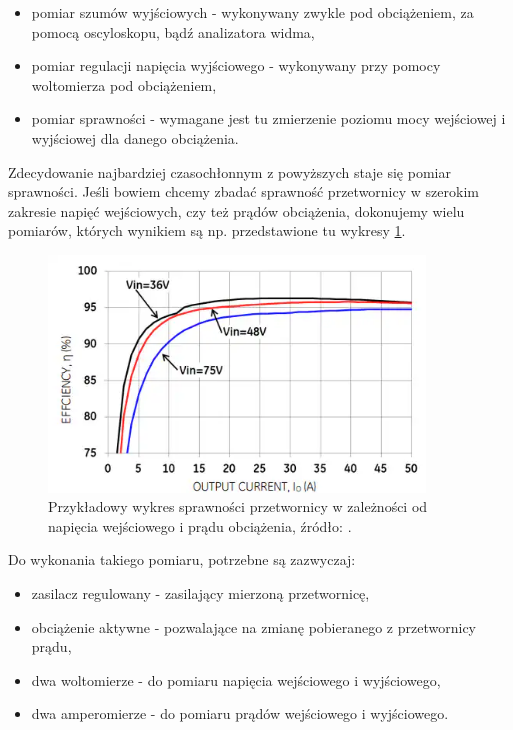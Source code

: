 \begin{itemize}
    \item pomiar szumów wyjściowych - wykonywany zwykle pod obciążeniem, za pomocą oscyloskopu, bądź analizatora widma,
    \item pomiar regulacji napięcia wyjściowego - wykonywany przy pomocy woltomierza pod obciążeniem,
    \item pomiar sprawności - wymagane jest tu zmierzenie poziomu mocy wejściowej i wyjściowej dla danego obciążenia. 
\end{itemize}

Zdecydowanie najbardziej czasochłonnym z powyższych staje się pomiar sprawności. Jeśli bowiem chcemy zbadać sprawność przetwornicy w szerokim zakresie napięć wejściowych, czy też prądów obciążenia, 
dokonujemy wielu pomiarów, których wynikiem są np. przedstawione tu wykresy \ref{fig:przykladowaSprawnosc}.

\begin{figure}[h!]
    \begin{center}
        \includegraphics[width = 10cm]{images/przykladowaSprawnosc.png}
        \caption{Przykładowy wykres sprawności przetwornicy w zależności od napięcia wejściowego i prądu obciążenia, źródło: \cite{przetwornicaOmniON}.}
        \label{fig:przykladowaSprawnosc}
    \end{center}
\end{figure}

Do wykonania takiego pomiaru, potrzebne są zazwyczaj:

\begin{itemize}
    \item zasilacz regulowany - zasilający mierzoną przetwornicę,
    \item obciążenie aktywne - pozwalające na zmianę pobieranego z przetwornicy prądu,
    \item dwa woltomierze - do pomiaru napięcia wejściowego i wyjściowego,
    \item dwa amperomierze - do pomiaru prądów wejściowego i wyjściowego.
\end{itemize}

